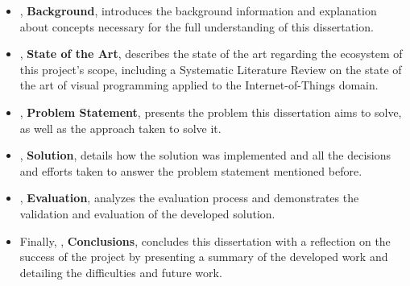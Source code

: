 \begin{itemize}
  \item {}, \textbf{Background},   introduces the background information and explanation about concepts necessary for the full understanding of this dissertation.
  \item {}, \textbf{State of the Art}, describes the state of the art regarding the ecosystem of this project's scope, including a Systematic Literature Review on the state of the art of visual programming applied to the Internet-of-Things domain.
  \item {}, \textbf{Problem Statement}, presents the problem this dissertation aims to solve, as well as the approach taken to solve it.
  \item {}, \textbf{Solution}, details how the solution was implemented and all the decisions and efforts taken to answer the problem statement mentioned before.
  \item {}, \textbf{Evaluation}, analyzes the evaluation process and demonstrates the validation and evaluation of the developed solution.
  \item Finally, , \textbf{Conclusions}, concludes this dissertation with a reflection on the success of the project by presenting a summary of the developed work and detailing the difficulties and future work.
\end{itemize}